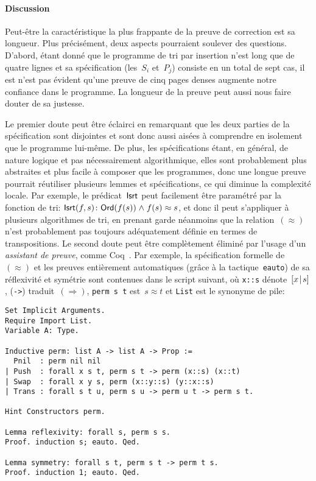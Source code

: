 \paragraph{Discussion}

Peut-être la caractéristique la plus frappante de la preuve de
correction est sa longueur. Plus précisément, deux aspects pourraient
soulever des questions. D'abord, étant donné que le programme de tri
par insertion n'est long que de quatre lignes et sa spécification
(les~\(S_i\) et~\(P_j\)) consiste en un total de sept cas, il est
n'est pas évident qu'une preuve de cinq pages denses augmente notre
confiance dans le programme. La longueur de la preuve peut aussi nous
faire douter de sa justesse.

Le premier doute peut être éclairci en remarquant que les deux parties
de la spécification sont disjointes et sont donc aussi aisées à
comprendre en isolement que le programme lui-même. De plus, les
spécifications étant, en général, de nature logique et pas
nécessairement algorithmique, elles sont probablement plus abstraites
et plus facile à composer que les programmes, donc une longue preuve
pourrait réutiliser plusieurs lemmes et spécifications, ce qui diminue
la complexité locale. Par exemple, le prédicat~\(\textsf{Isrt}\)
peut facilement être paramétré par la fonction de tri:
\(\textsf{Isrt}({f,s}) \colon \textsf{Ord}({f(s)}) \mathrel{\wedge} f(s)
\approx s\), et
donc il peut s'appliquer à plusieurs algorithmes de tri, en prenant
garde néanmoins que la relation~\((\approx)\) n'est probablement pas
toujours adéquatement définie en termes de transpositions. Le second
doute peut être complètement éliminé par l'usage d'un \emph{assistant
de preuve}, comme
\textsf{Coq}~\citep{BertotCasteran_2004}. Par exemple, la
spécification formelle de~\((\approx)\) et les preuves entièrement
automatiques (grâce à la tactique~\texttt{eauto}) de sa réflexivité et
symétrie sont contenues dans le script suivant, où \verb|x::s|
dénote~\([{x}\!\mid\!{s}]\), (\verb|->|) traduit~\((\Rightarrow)\),
\verb|perm s t| est~\(s \approx t\) et \verb|List| est le synonyme de
pile:
\begin{verbatim}
Set Implicit Arguments.
Require Import List.
Variable A: Type.

Inductive perm: list A -> list A -> Prop :=
  Pnil  : perm nil nil
| Push  : forall x s t, perm s t -> perm (x::s) (x::t)
| Swap  : forall x y s, perm (x::y::s) (y::x::s)
| Trans : forall s t u, perm s u -> perm u t -> perm s t.

Hint Constructors perm.

Lemma reflexivity: forall s, perm s s.
Proof. induction s; eauto. Qed.

Lemma symmetry: forall s t, perm s t -> perm t s.
Proof. induction 1; eauto. Qed.
\end{verbatim}

